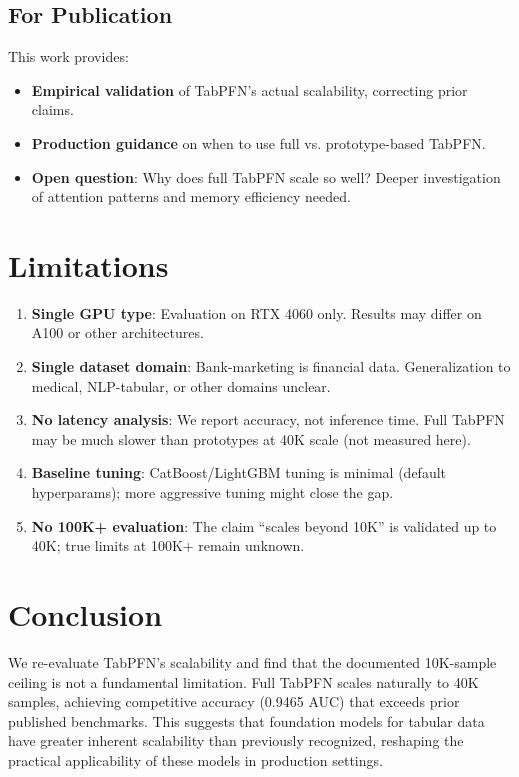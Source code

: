 \documentclass[11pt,a4paper]{article}
\begin{document}
\subsection{For Publication}

This work provides:
\begin{itemize}
\item \textbf{Empirical validation} of TabPFN's actual scalability, correcting prior claims.
\item \textbf{Production guidance} on when to use full vs. prototype-based TabPFN.
\item \textbf{Open question}: Why does full TabPFN scale so well? Deeper investigation of attention patterns and memory efficiency needed.
\end{itemize}

\section{Limitations}

\begin{enumerate}
\item \textbf{Single GPU type}: Evaluation on RTX 4060 only. Results may differ on A100 or other architectures.

\item \textbf{Single dataset domain}: Bank-marketing is financial data. Generalization to medical, NLP-tabular, or other domains unclear.

\item \textbf{No latency analysis}: We report accuracy, not inference time. Full TabPFN may be much slower than prototypes at 40K scale (not measured here).

\item \textbf{Baseline tuning}: CatBoost/LightGBM tuning is minimal (default hyperparams); more aggressive tuning might close the gap.

\item \textbf{No 100K+ evaluation}: The claim ``scales beyond 10K'' is validated up to 40K; true limits at 100K+ remain unknown.
\end{enumerate}

\section{Conclusion}

We re-evaluate TabPFN's scalability and find that the documented 10K-sample ceiling is not a fundamental limitation. Full TabPFN scales naturally to 40K samples, achieving competitive accuracy (0.9465 AUC) that exceeds prior published benchmarks. This suggests that foundation models for tabular data have greater inherent scalability than previously recognized, reshaping the practical applicability of these models in production settings.
\end{document}
